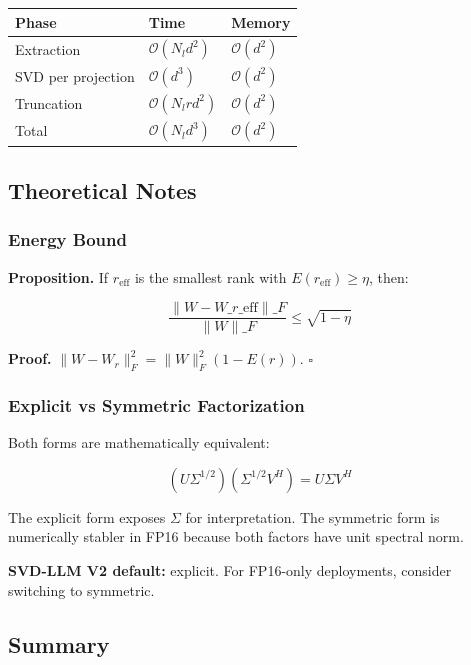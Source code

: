 \begin{table}[H]
\centering
\small
\begin{tabular}{lll}
\toprule
\textbf{Phase} & \textbf{Time} & \textbf{Memory} \\
\midrule
Extraction & $\mathcal{O}(N_l d^2)$ & $\mathcal{O}(d^2)$ \\
SVD per projection & $\mathcal{O}(d^3)$ & $\mathcal{O}(d^2)$ \\
Truncation & $\mathcal{O}(N_l r d^2)$ & $\mathcal{O}(d^2)$ \\
Total & $\mathcal{O}(N_l d^3)$ & $\mathcal{O}(d^2)$ \\
\bottomrule
\end{tabular}
\end{table}

\subsection{Theoretical Notes}

\subsubsection{Energy Bound}

\textbf{Proposition.} If $r_\text{eff}$ is the smallest rank with 
$E(r_\text{eff}) \geq \eta$, then:

\[
\frac{\|W - W\_{r\_\text{eff}}\|\_F}{\|W\|\_F} \leq \sqrt{1 - \eta}
\tag{4.3}
\]

\textbf{Proof.} $\|W - W_r\|_F^2 = \|W\|_F^2 (1 - E(r))$. $\square$

\subsubsection{Explicit vs Symmetric Factorization}

Both forms are mathematically equivalent:

\[
(U \Sigma^{1/2}) (\Sigma^{1/2} V^H) = U \Sigma V^H
\tag{4.4}
\]

The explicit form exposes $\Sigma$ for interpretation. The symmetric form is 
numerically stabler in FP16 because both factors have unit spectral norm.

\textbf{SVD-LLM V2 default:} explicit. For FP16-only deployments, consider 
switching to symmetric.

\subsection{Summary}

